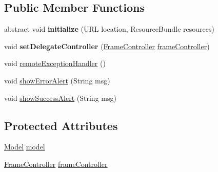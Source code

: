 \subsection*{Public Member Functions}
\begin{DoxyCompactItemize}
\item 
\hypertarget{classhu_1_1elte_1_1bfw1p6_1_1poker_1_1client_1_1controller_1_1_abstract_poker_client_controller_a92c20750f3c33efa704b02ad5534d025}{}abstract void {\bfseries initialize} (U\+R\+L location, Resource\+Bundle resources)\label{classhu_1_1elte_1_1bfw1p6_1_1poker_1_1client_1_1controller_1_1_abstract_poker_client_controller_a92c20750f3c33efa704b02ad5534d025}

\item 
\hypertarget{classhu_1_1elte_1_1bfw1p6_1_1poker_1_1client_1_1controller_1_1_abstract_poker_client_controller_a24041c411c238ba10c2d118232076bfd}{}void {\bfseries set\+Delegate\+Controller} (\hyperlink{classhu_1_1elte_1_1bfw1p6_1_1poker_1_1client_1_1controller_1_1main_1_1_frame_controller}{Frame\+Controller} \hyperlink{classhu_1_1elte_1_1bfw1p6_1_1poker_1_1client_1_1controller_1_1_abstract_poker_client_controller_a747c3be2b66fbc23a69bfe6ebe3e4022}{frame\+Controller})\label{classhu_1_1elte_1_1bfw1p6_1_1poker_1_1client_1_1controller_1_1_abstract_poker_client_controller_a24041c411c238ba10c2d118232076bfd}

\item 
void \hyperlink{classhu_1_1elte_1_1bfw1p6_1_1poker_1_1client_1_1controller_1_1_abstract_poker_client_controller_a92ea2d55f086a6ba7f9f6e3ebf670f93}{remote\+Exception\+Handler} ()
\item 
void \hyperlink{classhu_1_1elte_1_1bfw1p6_1_1poker_1_1client_1_1controller_1_1_abstract_poker_client_controller_a00b646be00e849752f4a9b66de2957cb}{show\+Error\+Alert} (String msg)
\item 
void \hyperlink{classhu_1_1elte_1_1bfw1p6_1_1poker_1_1client_1_1controller_1_1_abstract_poker_client_controller_a16cf89a7ee05f8d5b1dbbdb39c22cb7c}{show\+Success\+Alert} (String msg)
\end{DoxyCompactItemize}
\subsection*{Protected Attributes}
\begin{DoxyCompactItemize}
\item 
\hyperlink{classhu_1_1elte_1_1bfw1p6_1_1poker_1_1client_1_1model_1_1_model}{Model} \hyperlink{classhu_1_1elte_1_1bfw1p6_1_1poker_1_1client_1_1controller_1_1_abstract_poker_client_controller_a3e132d05c2e362b74ff9c220ce6c4f13}{model}
\item 
\hyperlink{classhu_1_1elte_1_1bfw1p6_1_1poker_1_1client_1_1controller_1_1main_1_1_frame_controller}{Frame\+Controller} \hyperlink{classhu_1_1elte_1_1bfw1p6_1_1poker_1_1client_1_1controller_1_1_abstract_poker_client_controller_a747c3be2b66fbc23a69bfe6ebe3e4022}{frame\+Controller}
\end{DoxyCompactItemize}


